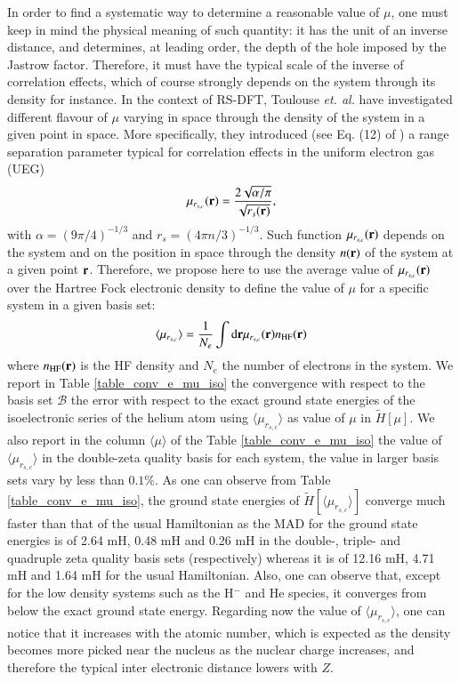 \documentclass[aip,jcp,reprint,noshowkeys,superscriptaddress]{revtex4-1}
\newcommand{\basis}[0]{\mathcal{B}}
\newcommand{\muav}{\langle \mu\rangle}
\newcommand{\mursc}{ \mu_{r_{s,c}}}
\newcommand{\murscav}{\langle \mu_{r_{s,c}}\rangle}
\begin{document}
In order to find a systematic way to determine a reasonable value of $\mu$, one must keep in mind the physical meaning of such quantity: it has the unit of an inverse distance, and determines, at leading order, the depth of the hole imposed by the Jastrow factor. 
Therefore, it must have the typical scale of the inverse of correlation effects, which of course strongly depends on the system through its density for instance. In the context of RS-DFT, Toulouse \textit{et. al.}\cite{TouColSav-JCP-05} have investigated different flavour of $\mu$ varying in space through the density of the system in a given point in space. 
More specifically, they introduced (see Eq. (12) of ) a range separation parameter typical for correlation effects in the uniform electron gas (UEG) 
\begin{equation}
 \mursc({\bf r}) =  \frac{2\sqrt{\alpha / \pi}}{\sqrt{r_s({\bf r})}},
\end{equation}
with $\alpha = (9 \pi/4)^{-1/3}$ and $r_s = (4 \pi n/3)^{-1/3}$. 
Such function $\mursc({\bf r})$ depends on the system and on the position in space through the density $n({\bf r})$ of the system at a given point ${\bf r}$. 
Therefore, we propose here to use the average value of $\mursc({\bf r})$ over the Hartree Fock electronic density to define the value of $\mu$ for a specific system in a given basis set:
\begin{equation}
 \label{eq:mu_av_rsc}
 \murscav = \frac{1}{N_e}\int \text{d}{\bf r} \mursc({\bf r}) n_{\text{HF}}({\bf r}) 
\end{equation}
where $n_{\text{HF}}({\bf r})$ is the HF density and $N_e$ the number of electrons in the system. 
We report in Table \ref{table_conv_e_mu_iso} the convergence with respect to the basis set $\basis$ the error with respect to the exact ground state energies of the isoelectronic series of the helium atom using $\murscav$ as value of $\mu$ in $\tilde{H}[\mu]$. 
We also report in the column $\muav$ of the Table \ref{table_conv_e_mu_iso} the value of $\murscav$ in the double-zeta quality basis for each system, the value in larger basis sets vary by less than $0.1\%$. 
As one can observe from  Table \ref{table_conv_e_mu_iso}, the ground state energies of $\tilde{H}[\murscav]$ converge much faster than that of the usual Hamiltonian as the MAD for the ground state energies is of 2.64 mH, 0.48 mH and 0.26 mH in the double-, triple- and quadruple zeta quality basis sets (respectively) whereas it is of 12.16 mH, 4.71 mH and 1.64 mH for the usual Hamiltonian. Also, one can observe that, except for the low density systems such as the H${^-}$ and He species, it converges from below the exact ground state energy. Regarding now the value of $\murscav $, one can notice that it increases with the atomic number, which is expected as the density becomes more picked near the nucleus as the nuclear charge increases, and therefore the typical inter electronic distance lowers with $Z$. 
\end{document}

